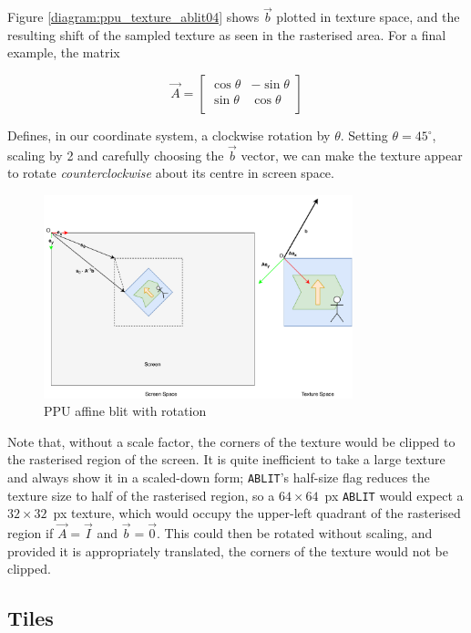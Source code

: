 Figure \ref{diagram:ppu_texture_ablit04} shows $\vec{b}$ plotted in texture space, and the resulting shift of the sampled texture as seen in the rasterised area. For a final example, the matrix

\[
\vec{A} = \begin{bmatrix}
\cos\theta & -\sin\theta \\
\sin\theta & \cos\theta \\
\end{bmatrix}
\]

Defines, in our coordinate system, a clockwise rotation by $\theta$. Setting $\theta=45^{\circ}$, scaling by 2 and carefully choosing the $\vec{b}$ vector, we can make the texture appear to rotate {\it counterclockwise} about its centre in screen space.

\begin{figure}[H]
\centering
\caption{PPU affine blit with rotation}
\label{diagram:ppu_texture_ablit05}
\includegraphics[width=0.8\textwidth]{diagrams/ppu_texture_ablit05.pdf}
\end{figure}

Note that, without a scale factor, the corners of the texture would be clipped to the rasterised region of the screen. It is quite inefficient to take a large texture and always show it in a scaled-down form; {\tt ABLIT}'s half-size flag reduces the texture size to half of the rasterised region, so a $64\times 64$~px {\tt ABLIT} would expect a $32\times 32$~px texture, which would occupy the upper-left quadrant of the rasterised region if $\vec{A}=\vec{I}$ and $\vec{b}=\vec{0}$. This could then be rotated without scaling, and provided it is appropriately translated, the corners of the texture would not be clipped.

\subsection{Tiles}
\label{section:tiles}

